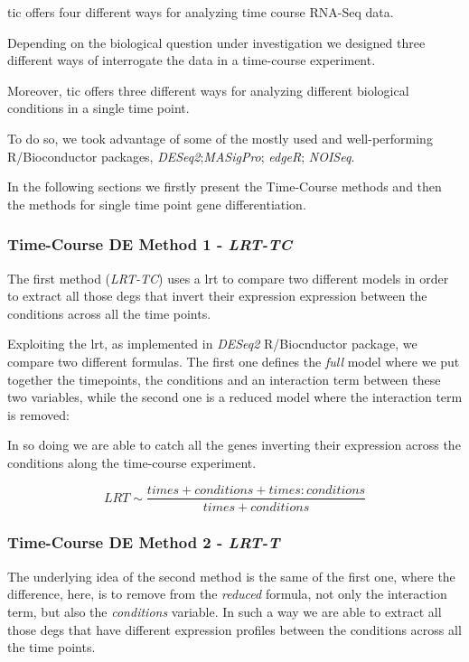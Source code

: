 \gls{tic} offers four different ways for analyzing time course RNA-Seq data.

Depending on the biological question under investigation we designed three different ways of interrogate the data in a time-course experiment.

Moreover, \gls{tic} offers three different ways for analyzing different biological conditions in a single time point.

To do so, we took advantage of some of the mostly used and well-performing \cite{Costa-Silva2017} R/Bioconductor packages, \textit{DESeq2}\cite{Love2014};\textit{MASigPro}\cite{Nueda2014}; \textit{edgeR}\cite{Robinson2009}; \textit{NOISeq}\cite{Tarazona2012}.

In the following sections we firstly present the Time-Course methods and then the methods for single time point gene differentiation.

\subsubsection{Time-Course DE Method 1 - \textit{LRT-TC}}
The first method (\textit{LRT-TC}) uses a \gls{lrt} to compare two different models in order to extract all those \glspl{deg} that invert their expression expression between the conditions across all the time points.

Exploiting the \gls{lrt}, as implemented in \textit{DESeq2} R/Biocnductor package, we compare two different formulas.
The first one defines the \textit{full} model where we put together the timepoints, the conditions and an interaction term between these two variables, while the second one is a reduced model where the interaction term is removed:

In so doing we are able to catch all the genes inverting their expression across the conditions along the time-course experiment. 

\[LRT \sim \frac{times+conditions+times:conditions}{times+conditions}\]


\subsubsection{Time-Course DE Method 2 - \textit{LRT-T}}
The underlying idea of the second method is the same of the first one, where the difference, here, is to remove from the \textit{reduced} formula, not only the interaction term, but also the \textit{conditions} variable.
In such a way we are able to extract all those \glspl{deg} that have different expression profiles between the conditions across all the time points.

